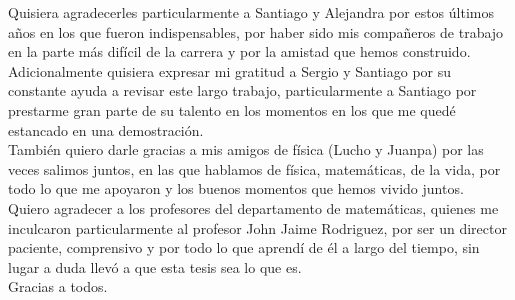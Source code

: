 Quisiera agradecerles particularmente a Santiago y Alejandra por estos últimos años en los que fueron indispensables, por haber sido mis compañeros de trabajo en la parte más difícil de la carrera y por la amistad que hemos construido.\\

Adicionalmente quisiera expresar mi gratitud a Sergio y Santiago por su constante ayuda a revisar este largo trabajo, particularmente a Santiago por prestarme gran parte de su talento en los momentos en los que me quedé estancado en una demostración.\\

También quiero darle gracias a  mis amigos de física (Lucho y Juanpa) por las veces salimos juntos, en las que hablamos de física, matemáticas, de la vida, por todo lo que me apoyaron y los buenos momentos que hemos vivido juntos.\\

Quiero agradecer a los profesores del departamento de matemáticas, quienes me inculcaron particularmente al profesor John Jaime Rodriguez, por ser un director paciente, comprensivo y por todo lo que aprendí de él a largo del tiempo, sin lugar a duda llevó a que esta tesis sea lo que es.\\

Gracias a todos.
\thispagestyle{empty}
